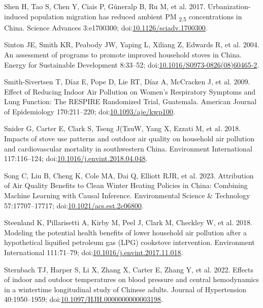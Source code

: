 \documentclass[
  letterpaper,
  DIV=11,
  numbers=noendperiod]{scrartcl}
\newlength{\cslhangindent}
\newenvironment{CSLReferences}[2] %
 {\begin{list}{}{%
  \setlength{\itemindent}{0pt}
  \setlength{\leftmargin}{0pt}
  \setlength{\parsep}{0pt}
  \ifodd #1
   \setlength{\leftmargin}{\cslhangindent}
   \setlength{\itemindent}{-1\cslhangindent}
  \fi
  \setlength{\itemsep}{#2\baselineskip}}}
 {\end{list}}
\begin{document}
\begin{CSLReferences}{1}{1}
Shen H, Tao S, Chen Y, Ciais P, Güneralp B, Ru M, et al. 2017.
Urbanization-induced population migration has reduced ambient {PM}
{\textsubscript{2.5}} concentrations in {China}. Science Advances
3:e1700300;
doi:\href{https://doi.org/10.1126/sciadv.1700300}{10.1126/sciadv.1700300}.

Sinton JE, Smith KR, Peabody JW, Yaping L, Xiliang Z, Edwards R, et al.
2004. An assessment of programs to promote improved household stoves in
{China}. Energy for Sustainable Development 8:33--52;
doi:\href{https://doi.org/10.1016/S0973-0826(08)60465-2}{10.1016/S0973-0826(08)60465-2}.

Smith-Sivertsen T, Díaz E, Pope D, Lie RT, Díaz A, McCracken J, et al.
2009. Effect of {Reducing Indoor Air Pollution} on {Women}'s
{Respiratory Symptoms} and {Lung Function}: {The RESPIRE Randomized
Trial}, {Guatemala}. American Journal of Epidemiology 170:211--220;
doi:\href{https://doi.org/10.1093/aje/kwp100}{10.1093/aje/kwp100}.

Snider G, Carter E, Clark S, Tseng J(TzuW, Yang X, Ezzati M, et al.
2018. Impacts of stove use patterns and outdoor air quality on household
air pollution and cardiovascular mortality in southwestern {China}.
Environment International 117:116--124;
doi:\href{https://doi.org/10.1016/j.envint.2018.04.048}{10.1016/j.envint.2018.04.048}.

Song C, Liu B, Cheng K, Cole MA, Dai Q, Elliott RJR, et al. 2023.
Attribution of {Air Quality Benefits} to {Clean Winter Heating Policies}
in {China}: {Combining Machine Learning} with {Causal Inference}.
Environmental Science \& Technology 57:17707--17717;
doi:\href{https://doi.org/10.1021/acs.est.2c06800}{10.1021/acs.est.2c06800}.

Steenland K, Pillarisetti A, Kirby M, Peel J, Clark M, Checkley W, et
al. 2018. Modeling the potential health benefits of lower household air
pollution after a hypothetical liquified petroleum gas ({LPG}) cookstove
intervention. Environment International 111:71--79;
doi:\href{https://doi.org/10.1016/j.envint.2017.11.018}{10.1016/j.envint.2017.11.018}.

Sternbach TJ, Harper S, Li X, Zhang X, Carter E, Zhang Y, et al. 2022.
Effects of indoor and outdoor temperatures on blood pressure and central
hemodynamics in a wintertime longitudinal study of {Chinese} adults.
Journal of Hypertension 40:1950--1959;
doi:\href{https://doi.org/10.1097/HJH.0000000000003198}{10.1097/HJH.0000000000003198}.


\end{CSLReferences}
\end{document}
